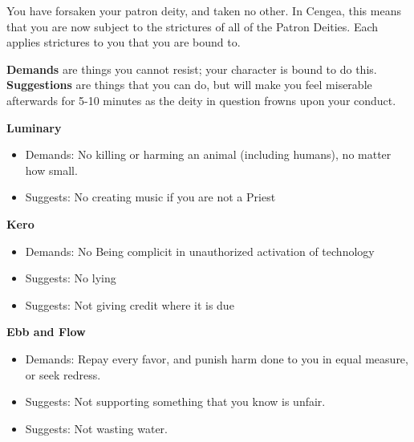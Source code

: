 \documentclass[green]{GL2020}
\begin{document}
\name{\gAbandonGods{}}

You have forsaken your patron deity, and taken no other. In Cengea, this means that you are now subject to the strictures of all of the Patron Deities. Each applies strictures to you that you are bound to.

\textbf{Demands} are things you cannot resist; your character is bound to do this.\\
\textbf{Suggestions} are things that you can do, but will make you feel miserable afterwards for 5-10 minutes as the deity in question frowns upon your conduct.

\vspace{1cm}

\textbf{Luminary}
\begin{itemize}
	\item Demands: No killing or harming an animal (including humans), no matter how small.
	\item Suggests:  No creating music if you are not a Priest
\end{itemize}

\textbf{Kero}
\begin{itemize}
	\item Demands: No Being complicit in unauthorized activation of technology
	\item Suggests:  No lying
	\item Suggests: Not giving credit where it is due
\end{itemize}

\textbf{Ebb and Flow}
\begin{itemize}
	\item Demands: Repay every favor, and punish harm done to you in equal measure, or seek redress.
	\item Suggests: Not supporting something that you know is unfair.
	\item Suggests: Not wasting water.
\end{itemize}
\end{document}
